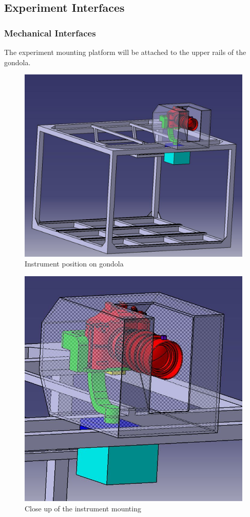 \subsection{Experiment Interfaces}

\subsubsection{Mechanical Interfaces}
\label{sec:4.2.1}
The experiment mounting platform will be attached to the upper rails of the gondola.



\begin{figure}[H]
    \centering
	\includegraphics[width=0.6\linewidth]{4-experiment-design/img/interfaces/Screenshot_Experiment.jpg}
	\caption{Instrument position on gondola}
\end{figure}

\begin{figure}[H]
    \centering
	\includegraphics[width=0.6\linewidth]{4-experiment-design/img/interfaces/Screenshot_Close_Up.jpg}
	\caption{Close up of the instrument mounting}
\end{figure}


